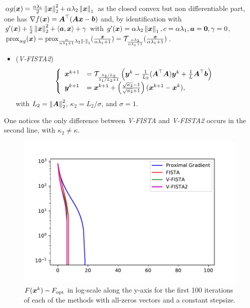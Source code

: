 $\alpha g(\boldsymbol x) = \frac{\alpha\lambda_1}{2} \left\lVert\boldsymbol x\right\rVert_{2}^2 
+ \alpha\lambda_2 \left\lVert\boldsymbol x\right\rVert_{1}$ as the closed 
convex but non differentiable part, one has 
$\nabla f(\boldsymbol x) = \boldsymbol A^\top (\boldsymbol{Ax}-\boldsymbol b)$ and, 
by identification with $g'(\boldsymbol x) + \frac{c}{2} 
\left\lVert\boldsymbol x\right\rVert_{2}^2 + \langle \boldsymbol a, \boldsymbol x \rangle + \gamma$ with 
$g'(\boldsymbol x) = \alpha\lambda_2 \left\lVert\boldsymbol x\right\rVert_{1}, 
c=\alpha\lambda_1, \boldsymbol a=\boldsymbol 0, \gamma=0$, 
$\operatorname{prox}_{\alpha g}(\boldsymbol x) = 
\operatorname{prox}_{\frac{\alpha}{\alpha\lambda_1+1} \lambda_2 
\left\lVert\cdot\right\rVert_{1}} (\frac{\boldsymbol x}{\alpha\lambda_1+1}) = 
\mathcal T_{\frac{\alpha\lambda_2}{\alpha\lambda_1+1}} 
(\frac{\boldsymbol x}{\alpha\lambda_1+1})$.
%
\begin{itemize}
    \item (\emph{V-FISTA2})
    \begin{align*}
    \begin{split}
        \left\{
        \begin{array}{ll}
            \boldsymbol x^{k+1} &= \mathcal T_{\frac{\lambda_2/L_2}{
            \lambda_1/L_2 + 1}} 
            \left( \boldsymbol y^k - {\textstyle\frac{1}{L_2}} (\boldsymbol A^\top \boldsymbol A) 
            \boldsymbol y^k + {\textstyle\frac{1}{L}} \boldsymbol A^\top\boldsymbol b \right) \\
            \boldsymbol y^{k+1} &= \boldsymbol x^{k+1} + \left( 
            \frac{\sqrt{\kappa_2}-1}{\sqrt{\kappa_2}+1} 
            \right) (\boldsymbol x^{k+1}- \boldsymbol x^k),
        \end{array}
        \right.
    \end{split}
    \end{align*}
    with $L_2=\left\lVert\boldsymbol A\right\rVert_{2}^2$, $\kappa_2=L_2/\sigma$, 
    and $\sigma=1$.
\end{itemize}
%
One notices the only difference between \emph{V-FISTA} and 
\emph{V-FISTA2} occurs in the second line, with $\kappa_2
\neq \kappa$.
%
\begin{figure}[H]
    \centering
    \includegraphics[width=14cm]{images/part2_ex0.pdf}
    \caption{$F(\boldsymbol x^k)-F_{\text{opt}}$ in log-scale along the 
  y-axis for the first 100 iterations of each of the methods 
  with all-zeros vectors and a constant stepsize. }
  \label{fig: ex0}
\end{figure}
